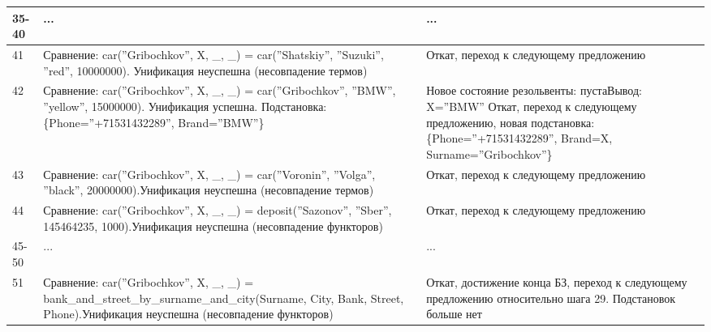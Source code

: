 \documentclass[12pt]{report}
\begin{document}
\begin{table}[H]
	\begin{center}
		\begin{tabular}{|p{1 cm}|p{11 cm}|p{7 cm}|}
			\hline
			35-40 & ... & ... \\
			\hline
			41 & Сравнение: \newline car(''Gribochkov'', X, \_, \_) = \newline car(''Shatskiy'', ''Suzuki'', ''red'', 10000000). \newline Унификация неуспешна (несовпадение термов) & Откат, переход к следующему предложению \\
			\hline
			42 & Сравнение: \newline car(''Gribochkov'', X, \_, \_) = \newline car(''Gribochkov'', ''BMW'', ''yellow'', 15000000). \newline Унификация успешна. \newline Подстановка: \{Phone=''+71531432289'', Brand=''BMW''\} & Новое состояние резольвенты: пуста\newline Вывод: X=''BMW'' \newline Откат, переход к следующему предложению, новая подстановка: \{Phone=''+71531432289'', Brand=X, Surname=''Gribochkov''\} \\
			\hline
			43 & Сравнение: \newline car(''Gribochkov'', X, \_, \_) = \newline car(''Voronin'', ''Volga'', ''black'', 20000000).\newline Унификация неуспешна (несовпадение термов) & Откат, переход к следующему предложению \\
			\hline 
			44 & Сравнение: \newline car(''Gribochkov'', X, \_, \_) = \newline deposit(''Sazonov'', ''Sber'', 145464235, 1000).\newline Унификация неуспешна (несовпадение функторов) & Откат, переход к следующему предложению \\
			\hline 
			45-50 & ... & ... \\
			\hline
			51 & Сравнение: \newline car(''Gribochkov'', X, \_, \_) = \newline bank\_and\_street\_by\_surname\_and\_city(\newline Surname, City, Bank, Street, Phone).\newline Унификация неуспешна (несовпадение функторов) & Откат, достижение конца БЗ, переход к следующему предложению относительно шага 29. Подстановок больше нет \\

\end{tabular}
\end{center}
\end{table}
\end{document}
